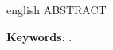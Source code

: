 \begin{resumo}[Abstract]
    \begin{otherlanguage*}{english}
    ABSTRACT
    
    \vspace{\onelineskip}
    
    \noindent 
    \textbf{Keywords}: .
    \end{otherlanguage*}
\end{resumo}


\listoffigures*
\cleardoublepage




\listofquadros*
\cleardoublepage
